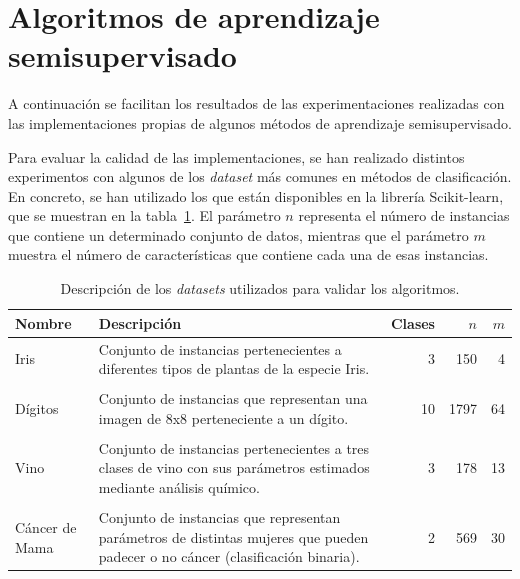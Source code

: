 
\section{Algoritmos de aprendizaje semisupervisado}

A continuación se facilitan los resultados de las experimentaciones realizadas con las implementaciones propias de algunos métodos de aprendizaje semisupervisado.

Para evaluar la calidad de las implementaciones, se han realizado distintos experimentos con algunos de los \textit{dataset} más comunes en métodos de clasificación. En concreto, se han utilizado los que están disponibles en la librería Scikit-learn, que se muestran en la tabla~\ref{tabla_datasets_sklearn}. El parámetro $n$ representa el número de instancias que contiene un determinado conjunto de datos, mientras que el parámetro $m$ muestra el número de características que contiene cada una de esas instancias.

\begin{table}
	\small
	\begin{centering}
		\begin{tabular}{@{}p{4em} p{20em} r r r @{}}
			\toprule
			\textbf{Nombre} & \textbf{Descripción} & \textbf{Clases} & $n$ & $m$\\ 
			\midrule
			
			Iris & Conjunto de instancias pertenecientes a diferentes tipos de plantas de la especie Iris. & 3 & 150 & 4 \\\\
			Dígitos & Conjunto de instancias que representan una imagen de 8x8 perteneciente a un dígito. & 10 & 1797 & 64 \\\\
			Vino & Conjunto de instancias pertenecientes a tres clases de vino con sus parámetros estimados mediante análisis químico. & 3 & 178 & 13 \\\\
			Cáncer de Mama & Conjunto de instancias que representan parámetros de distintas mujeres que pueden padecer o no cáncer (clasificación binaria). & 2 & 569 & 30 \\
			\bottomrule
		\end{tabular}
	\end{centering}
	\caption[Experimentación: \textit{datasets} estándar]{Descripción de los \textit{datasets} utilizados para validar los algoritmos.}
	\label{tabla_datasets_sklearn}	
\end{table}



